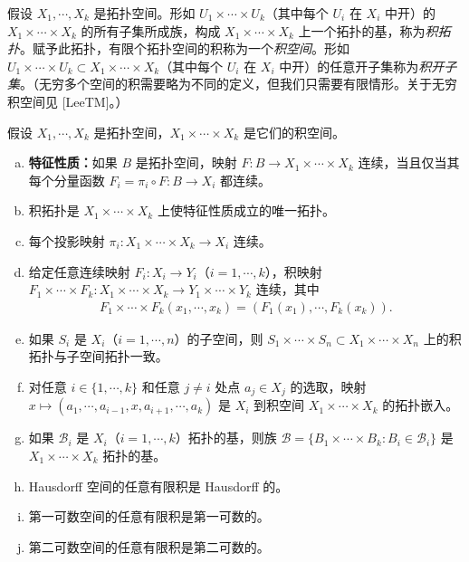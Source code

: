 \documentclass[../../main.tex]{subfiles}
\begin{document}
假设 $X_1,\cdots ,X_k$ 是拓扑空间。形如 $U_1\times\cdots\times U_k$（其中每个 $U_i$ 在 $X_i$ 中开）的 $X_1\times\cdots\times X_k$ 的所有子集所成族，构成 $X_1\times\cdots\times X_k$ 上一个拓扑的基，称为\emph{积拓扑}。赋予此拓扑，有限个拓扑空间的积称为一个\emph{积空间}。形如 $U_1\times\cdots\times U_k\subset X_1\times\cdots\times X_k$（其中每个 $U_i$ 在 $X_i$ 中开）的任意开子集称为\emph{积开子集}。（无穷多个空间的积需要略为不同的定义，但我们只需要有限情形。关于无穷积空间见 [LeeTM]。）

\begin{proposition}[积拓扑的性质]\label{proposition:appA-product-properties}
假设 $X_1,\cdots ,X_k$ 是拓扑空间，$X_1\times\cdots\times X_k$ 是它们的积空间。
\begin{enumerate}[(a)]
\item \textbf{特征性质：}如果 $B$ 是拓扑空间，映射 $F:B\to X_1\times\cdots\times X_k$ 连续，当且仅当其每个分量函数 $F_i=\pi_i\circ F:B\to X_i$ 都连续。
\item 积拓扑是 $X_1\times\cdots\times X_k$ 上使特征性质成立的唯一拓扑。
\item 每个投影映射 $\pi_i:X_1\times\cdots\times X_k\to X_i$ 连续。
\item 给定任意连续映射 $F_i:X_i\to Y_i$（$i=1,\cdots ,k$），积映射 $F_1\times\cdots\times F_k:X_1\times\cdots\times X_k\to Y_1\times\cdots\times Y_k$ 连续，其中
\begin{align*}
F_1\times\cdots\times F_k(x_1,\cdots ,x_k)=(F_1(x_1),\cdots ,F_k(x_k)).
\end{align*}
\item 如果 $S_i$ 是 $X_i$（$i=1,\cdots ,n$）的子空间，则 $S_1\times\cdots\times S_n\subset X_1\times\cdots\times X_n$ 上的积拓扑与子空间拓扑一致。
\item 对任意 $i\in\{1,\cdots ,k\}$ 和任意 $j\neq i$ 处点 $a_j\in X_j$ 的选取，映射 $x\mapsto(a_1,\cdots ,a_{i-1},x,a_{i+1},\cdots ,a_k)$ 是 $X_i$ 到积空间 $X_1\times\cdots\times X_k$ 的拓扑嵌入。
\item 如果 $\mathcal B_i$ 是 $X_i$（$i=1,\cdots ,k$）拓扑的基，则族 $\mathcal B=\{B_1\times\cdots\times B_k:B_i\in\mathcal B_i\}$ 是 $X_1\times\cdots\times X_k$ 拓扑的基。
\item Hausdorff 空间的任意有限积是 Hausdorff 的。
\item 第一可数空间的任意有限积是第一可数的。
\item 第二可数空间的任意有限积是第二可数的。
\end{enumerate}
\end{proposition}
\end{document}
